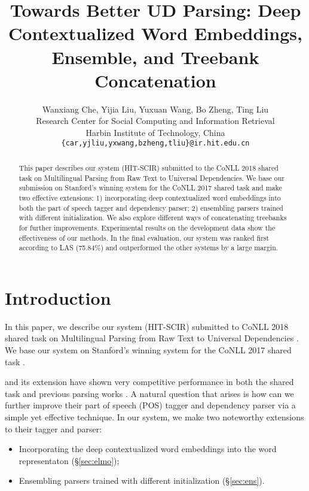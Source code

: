 \documentclass[11pt,a4paper]{article}
\title{Towards Better UD Parsing: Deep Contextualized Word Embeddings, Ensemble, and Treebank Concatenation}
\author{Wanxiang Che, Yijia Liu, Yuxuan Wang, Bo Zheng, Ting Liu \\
	Research Center for Social Computing and Information Retrieval \\
	Harbin Institute of Technology, China \\
	{\tt \{car,yjliu,yxwang,bzheng,tliu\}@ir.hit.edu.cn}	}
\date{}
\begin{document}
\maketitle


\begin{abstract}
This paper describes our system (HIT-SCIR)
submitted to the  CoNLL 2018 shared
task on Multilingual Parsing from Raw Text to 
Universal Dependencies.
We base our submission on Stanford's winning system for the CoNLL 2017 shared task
and make two effective extensions: 
1) incorporating deep contextualized
word embeddings into both the part of speech
tagger and dependency parser;
2) ensembling parsers trained with different initialization.
We also explore different ways of concatenating treebanks
for further improvements.
Experimental results on the development data
show the effectiveness of our methods.
In the final evaluation,
our system was ranked first according to LAS (75.84\%)
and outperformed the other systems by a large margin.

\end{abstract}

\section{Introduction}

In this paper, we describe our system (HIT-SCIR) submitted to CoNLL 2018 shared
task on Multilingual Parsing from Raw Text to 
Universal Dependencies \cite{udst:overview}.
We base our system on Stanford's winning system \citep[\S\ref{sec:biaffine}]{dozat-qi-manning:2017:K17-3}
for the CoNLL 2017 shared task \cite{udst:overview2017}.

\citet{DBLP:journals/corr/DozatM16} and
its extension \cite{dozat-qi-manning:2017:K17-3} have
shown very competitive performance in both the shared task \cite{dozat-qi-manning:2017:K17-3}
and previous parsing works \cite{ma-hovy:2017:I17-1,shi-huang-lee:2017:EMNLP2017,N18-1088,DBLP:journals/corr/abs-1805-01087}.
A natural question that arises is how can we further improve
their part of speech (POS) tagger and dependency parser
via a simple yet effective technique.
In our system, we make two noteworthy extensions to their tagger and parser:
\begin{itemize}
	\item Incorporating the deep contextualized word embeddings \cite[ELMo: Embeddings from Language Models]{N18-1202} into the word representaton (\S\ref{sec:elmo});
	\item Ensembling parsers trained with different initialization (\S\ref{sec:ens}).
\end{itemize}
\end{document}
